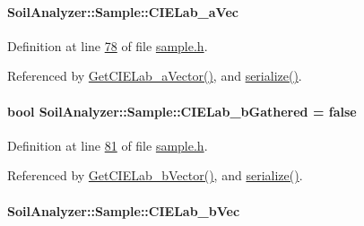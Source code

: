 \paragraph[{C\+I\+E\+Lab\+\_\+a\+Vec}]{ Soil\+Analyzer\+::\+Sample\+::\+C\+I\+E\+Lab\+\_\+a\+Vec\hspace{0.3cm}{\ttfamily [private]}}\label{class_soil_analyzer_1_1_sample_ad5c684c7875dd7b5daca94925e469005}


Definition at line \hyperlink{sample_8h_source_l00078}{78} of file \hyperlink{sample_8h_source}{sample.\+h}.



Referenced by \hyperlink{sample_8cpp_source_l00094}{Get\+C\+I\+E\+Lab\+\_\+a\+Vector()}, and \hyperlink{sample_8h_source_l00085}{serialize()}.

\hypertarget{class_soil_analyzer_1_1_sample_a579a9c20e5011249037f28faae8a6415}{}
\paragraph[{C\+I\+E\+Lab\+\_\+b\+Gathered}]{\setlength{\rightskip}{0pt plus 5cm}bool Soil\+Analyzer\+::\+Sample\+::\+C\+I\+E\+Lab\+\_\+b\+Gathered = false\hspace{0.3cm}{\ttfamily [private]}}\label{class_soil_analyzer_1_1_sample_a579a9c20e5011249037f28faae8a6415}


Definition at line \hyperlink{sample_8h_source_l00081}{81} of file \hyperlink{sample_8h_source}{sample.\+h}.



Referenced by \hyperlink{sample_8cpp_source_l00104}{Get\+C\+I\+E\+Lab\+\_\+b\+Vector()}, and \hyperlink{sample_8h_source_l00085}{serialize()}.

\hypertarget{class_soil_analyzer_1_1_sample_a7d39c10c64aa4815264e70fb96360448}{}
\paragraph[{C\+I\+E\+Lab\+\_\+b\+Vec}]{ Soil\+Analyzer\+::\+Sample\+::\+C\+I\+E\+Lab\+\_\+b\+Vec\hspace{0.3cm}{\ttfamily [private]}}\label{class_soil_analyzer_1_1_sample_a7d39c10c64aa4815264e70fb96360448}


